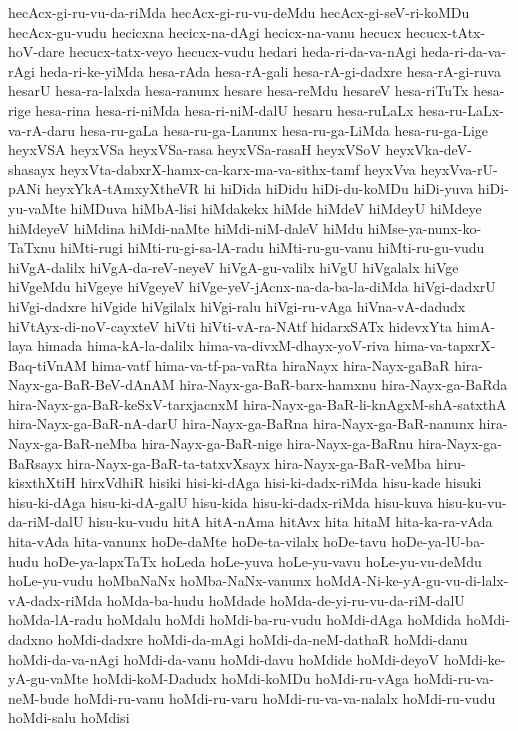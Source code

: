{hecAcx-gi-ru-vu-da-riMda
hecAcx-gi-ru-vu-deMdu
hecAcx-gi-seV-ri-koMDu
hecAcx-gu-vudu
hecicxna
hecicx-na-dAgi
hecicx-na-vanu
hecucx
hecucx-tAtx-hoV-dare
hecucx-tatx-veyo
hecucx-vudu
hedari
heda-ri-da-va-nAgi
heda-ri-da-va-rAgi
heda-ri-ke-yiMda
hesa-rAda
hesa-rA-gali
hesa-rA-gi-dadxre
hesa-rA-gi-ruva
hesarU
hesa-ra-lalxda
hesa-ranunx
hesare
hesa-reMdu
hesareV
hesa-riTuTx
hesa-rige
hesa-rina
hesa-ri-niMda
hesa-ri-niM-dalU
hesaru
hesa-ruLaLx
hesa-ru-LaLx-va-rA-daru
hesa-ru-gaLa
hesa-ru-ga-Lanunx
hesa-ru-ga-LiMda
hesa-ru-ga-Lige
heyxVSA
heyxVSa
heyxVSa-rasa
heyxVSa-rasaH
heyxVSoV
heyxVka-deV-shasayx
heyxVta-dabxrX-hamx-ca-karx-ma-va-sithx-tamf
heyxVva
heyxVva-rU-pANi
heyxYkA-tAmxyXtheVR
hi
hiDida
hiDidu
hiDi-du-koMDu
hiDi-yuva
hiDi-yu-vaMte
hiMDuva
hiMbA-lisi
hiMdakekx
hiMde
hiMdeV
hiMdeyU
hiMdeye
hiMdeyeV
hiMdina
hiMdi-naMte
hiMdi-niM-daleV
hiMdu
hiMse-ya-nunx-ko-TaTxnu
hiMti-rugi
hiMti-ru-gi-sa-lA-radu
hiMti-ru-gu-vanu
hiMti-ru-gu-vudu
hiVgA-dalilx
hiVgA-da-reV-neyeV
hiVgA-gu-valilx
hiVgU
hiVgalalx
hiVge
hiVgeMdu
hiVgeye
hiVgeyeV
hiVge-yeV-jAcnx-na-da-ba-la-diMda
hiVgi-dadxrU
hiVgi-dadxre
hiVgide
hiVgilalx
hiVgi-ralu
hiVgi-ru-vAga
hiVna-vA-dadudx
hiVtAyx-di-noV-cayxteV
hiVti
hiVti-vA-ra-NAtf
hidarxSATx
hidevxYta
himA-laya
himada
hima-kA-la-dalilx
hima-va-divxM-dhayx-yoV-riva
hima-va-tapxrX-Baq-tiVnAM
hima-vatf
hima-va-tf-pa-vaRta
hiraNayx
hira-Nayx-gaBaR
hira-Nayx-ga-BaR-BeV-dAnAM
hira-Nayx-ga-BaR-barx-hamxnu
hira-Nayx-ga-BaRda
hira-Nayx-ga-BaR-keSxV-tarxjacnxM
hira-Nayx-ga-BaR-li-knAgxM-shA-satxthA
hira-Nayx-ga-BaR-nA-darU
hira-Nayx-ga-BaRna
hira-Nayx-ga-BaR-nanunx
hira-Nayx-ga-BaR-neMba
hira-Nayx-ga-BaR-nige
hira-Nayx-ga-BaRnu
hira-Nayx-ga-BaRsayx
hira-Nayx-ga-BaR-ta-tatxvXsayx
hira-Nayx-ga-BaR-veMba
hiru-kisxthXtiH
hirxVdhiR
hisiki
hisi-ki-dAga
hisi-ki-dadx-riMda
hisu-kade
hisuki
hisu-ki-dAga
hisu-ki-dA-galU
hisu-kida
hisu-ki-dadx-riMda
hisu-kuva
hisu-ku-vu-da-riM-dalU
hisu-ku-vudu
hitA
hitA-nAma
hitAvx
hita
hitaM
hita-ka-ra-vAda
hita-vAda
hita-vanunx
hoDe-daMte
hoDe-ta-vilalx
hoDe-tavu
hoDe-ya-lU-ba-hudu
hoDe-ya-lapxTaTx
hoLeda
hoLe-yuva
hoLe-yu-vavu
hoLe-yu-vu-deMdu
hoLe-yu-vudu
hoMbaNaNx
hoMba-NaNx-vanunx
hoMdA-Ni-ke-yA-gu-vu-di-lalx-vA-dadx-riMda
hoMda-ba-hudu
hoMdade
hoMda-de-yi-ru-vu-da-riM-dalU
hoMda-lA-radu
hoMdalu
hoMdi
hoMdi-ba-ru-vudu
hoMdi-dAga
hoMdida
hoMdi-dadxno
hoMdi-dadxre
hoMdi-da-mAgi
hoMdi-da-neM-dathaR
hoMdi-danu
hoMdi-da-va-nAgi
hoMdi-da-vanu
hoMdi-davu
hoMdide
hoMdi-deyoV
hoMdi-ke-yA-gu-vaMte
hoMdi-koM-Dadudx
hoMdi-koMDu
hoMdi-ru-vAga
hoMdi-ru-va-neM-bude
hoMdi-ru-vanu
hoMdi-ru-varu
hoMdi-ru-va-va-nalalx
hoMdi-ru-vudu
hoMdi-salu
hoMdisi
}
